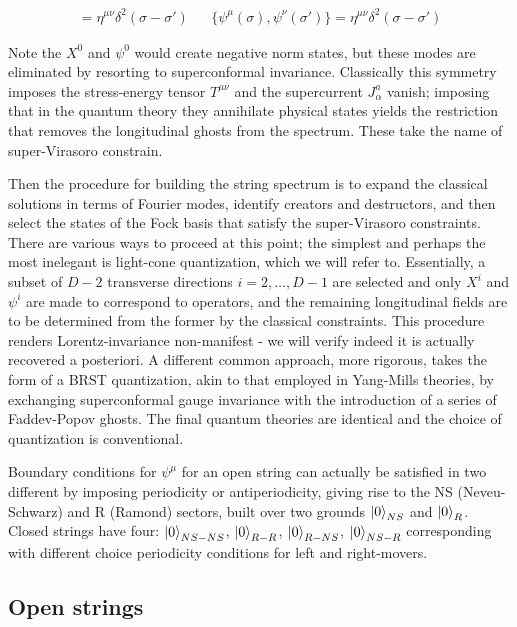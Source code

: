 \begin{align}
[X^\mu(\sigma),X^\nu(\sigma')] = \eta^{\mu\nu} \delta^2(\sigma-\sigma') && \{\psi^\mu(\sigma),\psi^\nu(\sigma')\} = \eta^{\mu\nu} \delta^2(\sigma-\sigma')
\end{align}

Note the $X^0$ and $\psi^0$ would create negative norm states, but these modes are eliminated by resorting to superconformal invariance. Classically this symmetry imposes the stress-energy tensor $T^{\mu\nu}$ and the supercurrent $J^a_\alpha$ vanish; imposing that in the quantum theory they annihilate physical states yields the restriction that removes the longitudinal ghosts from the spectrum. These take the name of super-Virasoro constrain.

Then the procedure for building the string spectrum is to expand the classical solutions in terms of Fourier modes, identify creators and destructors, and then select the states of the Fock basis that satisfy the super-Virasoro constraints. There are various ways to proceed at this point; the simplest and perhaps the most inelegant is light-cone quantization, which we will refer to. Essentially, a subset of $D-2$ transverse directions $i=2,\ldots,D-1$ are selected and only $X^i$ and $\psi^i$ are made to correspond to operators, and the remaining longitudinal fields are to be determined from the former by the classical constraints. This procedure renders Lorentz-invariance non-manifest - we will verify indeed it is actually recovered a posteriori. A different common approach, more rigorous, takes the form of a BRST quantization, akin to that employed in Yang-Mills theories, by exchanging superconformal gauge invariance with the introduction of a series of Faddev-Popov ghosts. The final quantum theories are identical and the choice of quantization is conventional.

Boundary conditions for $\psi^\mu$ for an open string can actually be satisfied in two different by imposing periodicity or antiperiodicity, giving rise to the NS (Neveu-Schwarz) and R (Ramond) sectors, built over two grounds $\ket{0}_{NS}$ and $\ket{0}_R$. Closed strings have four: $\ket{0}_{NS-NS}$, $\ket{0}_{R-R}$, $\ket{0}_{R-NS}$, $\ket{0}_{NS-R}$ corresponding with different choice periodicity conditions for left and right-movers.

\subsection{Open strings}\label{sec:openstring}

